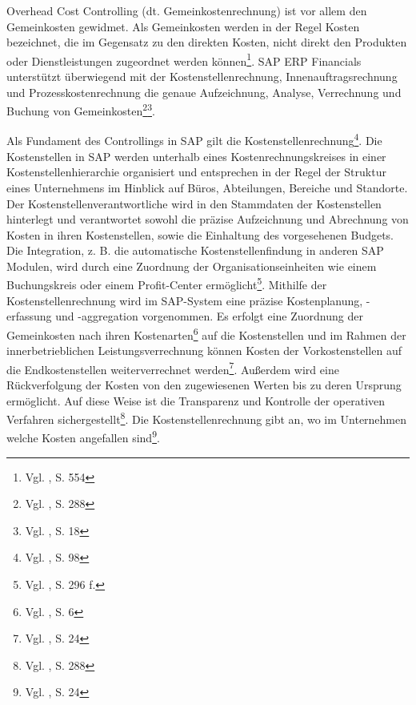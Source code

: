 Overhead Cost Controlling (dt. Gemeinkostenrechnung) ist vor allem den Gemeinkosten gewidmet. Als Gemeinkosten werden in der Regel Kosten bezeichnet, die im Gegensatz zu den direkten Kosten, nicht direkt den Produkten oder Dienstleistungen zugeordnet werden können\footnote{Vgl. \cite{Baier2009}, S. 554}. SAP ERP Financials unterstützt überwiegend mit der Kostenstellenrechnung, Innenauftragsrechnung und Prozesskostenrechnung die genaue Aufzeichnung, Analyse, Verrechnung und Buchung von Gemeinkosten\footnote{Vgl. \cite{Patel2009}, S. 288}\footnote{Vgl. \cite{SAPCOOMCCA2001}, S. 18}. 

Als Fundament des Controllings in SAP gilt die Kostenstellenrechnung\footnote{Vgl. \cite{Klein2010}, S. 98}.
Die Kostenstellen in SAP werden unterhalb eines Kostenrechnungskreises in einer Kostenstellenhierarchie organisiert und entsprechen in der Regel der Struktur eines Unternehmens im Hinblick auf Büros, Abteilungen, Bereiche und Standorte. Der Kostenstellenverantwortliche wird in den Stammdaten der Kostenstellen hinterlegt und verantwortet sowohl die präzise Aufzeichnung und Abrechnung von Kosten in ihren Kostenstellen, sowie die Einhaltung des vorgesehenen Budgets. Die Integration, z. B. die automatische Kostenstellenfindung in anderen SAP Modulen, wird durch eine Zuordnung der Organisationseinheiten wie einem Buchungskreis oder einem Profit-Center ermöglicht\footnote{Vgl. \cite{Patel2009}, S. 296 f.}.
Mithilfe der Kostenstellenrechnung wird im SAP-System eine präzise Kostenplanung, -erfassung und -aggregation vorgenommen. Es erfolgt eine Zuordnung der Gemeinkosten nach ihren Kostenarten\footnote{Vgl. \cite{SAPOMCEL2001}, S. 6} auf die Kostenstellen und im Rahmen der innerbetrieblichen Leistungsverrechnung können Kosten der Vorkostenstellen auf die Endkostenstellen weiterverrechnet werden\footnote{Vgl. \cite{Friedl2008}, S. 24}. Außerdem wird eine Rückverfolgung der Kosten von den zugewiesenen Werten bis zu deren Ursprung ermöglicht. 
Auf diese Weise ist die Transparenz und Kontrolle der operativen Verfahren sichergestellt\footnote{Vgl. \cite{Patel2009}, S. 288}. 
Die Kostenstellenrechnung gibt an, wo im Unternehmen welche Kosten angefallen sind\footnote{Vgl. \cite{Friedl2008}, S. 24}.

